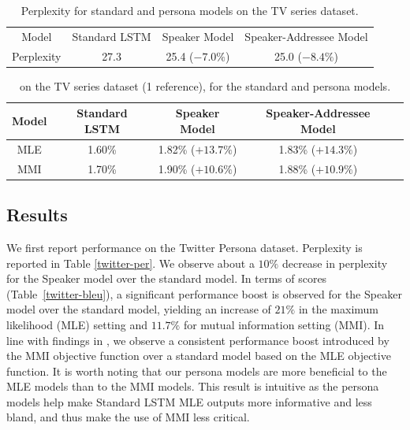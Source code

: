 \begin{table}
\centering
\begin{tabular}{cccc}\toprule
Model&Standard LSTM&Speaker Model& Speaker-Addressee Model \\
Perplexity&27.3&25.4 ($-7.0\%$)& 25.0 ($-8.4\%$)  \\\bottomrule
\end{tabular}
\caption[Perplexity for the persona model on the TV series dataset]{Perplexity for standard \sts and persona models on the TV series dataset.}
\label{tv-per}
\end{table}
\begin{table}
\centering
\begin{tabular}{ccccc}\toprule
Model&Standard LSTM&Speaker Model& Speaker-Addressee Model \\\midrule
MLE&1.60\%& 1.82\% ($+13.7\%$)& 1.83\%  ($+14.3\%$) \\
MMI&1.70\%& 1.90\% ($+10.6\%$) &1.88\% ($+10.9\%$) \\\bottomrule
\end{tabular}
\caption[\bleu for the persona model on the TV series dataset]{
\bleu on the TV series dataset (1 reference), for the
standard \sts and persona models.}
\label{tv-bleu}
\end{table}

\subsection{Results}
We first report performance on the Twitter Persona dataset.
Perplexity is reported in Table \ref{twitter-per}. We observe about a $10\%$ decrease in perplexity for the Speaker model over the standard \sts model. 
In terms of \bleu scores (Table~\ref{twitter-bleu}), a significant performance boost 
is observed for 
 the Speaker model over the standard \sts model, yielding an increase of $21\%$
in the maximum likelihood (MLE) setting and $11.7\%$ for mutual information setting (MMI). 
In line with findings in \cite{li2015diversity}, we observe a consistent performance boost introduced by 
the MMI objective function 
over a standard \sts model based on the MLE objective function. 
It is worth noting that our persona models are more beneficial to the MLE models
than to the MMI models. This result is intuitive as the persona models help make 
Standard LSTM MLE outputs more informative and less bland, and thus make the use 
of MMI less critical.


